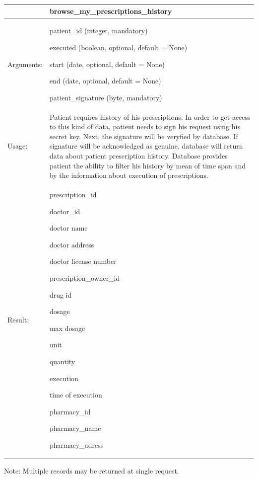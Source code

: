 
    \begin{longtable}{| p{3cm} | p{10.75cm} |}
    \hline
     & browse\_my\_prescriptions\_history \\ \hline
    Arguments: &  \begin{packed_enum}
    	\item patient\_id (integer, mandatory)
		\item executed (boolean, optional, default = None)
		\item start (date, optional, default = None)
		\item end (date, optional, default = None)
		\item patient\_signature (byte, mandatory)
	\end{packed_enum}     \\ \hline
    Usage: & Patient requires history of his prescriptions. In order to get access to this kind of data, patient needs to sign his request using his secret key. Next, the signature will be veryfied by database. If signature will be acknowledged as genuine, database will return data about patient prescription history. Database provides patient the ability to filter his history by mean of time span and by the information about execution of prescriptions. \\ \hline
    Result: & \begin{packed_enum}
    	\item prescription\_id
    	\item doctor\_id
    	\item doctor name
    	\item doctor address
    	\item doctor license number
    	\item prescription\_owner\_id
    	\item drug id
    	\item dosage
    	\item max dosage
    	\item unit
    	\item quantity
    	\item execution
    	\item time of execution
    	\item pharmacy\_id
    	\item pharmacy\_name
    	\item pharmacy\_adress
	\end{packed_enum}     \\ \hline	
    \end{longtable}
Note: Multiple records may be returned at single request.


